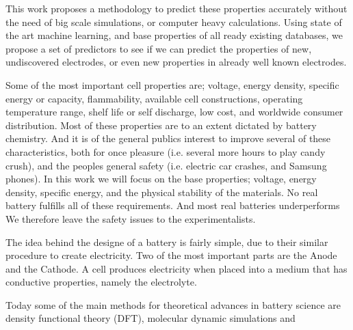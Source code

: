 This work proposes a methodology to predict these properties accurately without the need of big scale simulations, or computer heavy calculations. Using state of the art machine learning, and base properties of all ready existing databases, we propose a set of predictors to see if we can predict the properties of new, undiscovered electrodes, or even new properties in already well known electrodes.

Some of the most important cell properties are; voltage, energy density, specific energy or capacity, flammability, available cell constructions, operating temperature range, shelf life or self discharge, low cost, and worldwide consumer distribution. Most of these properties are to an extent dictated by battery chemistry. And it is of the general publics interest to improve several of these characteristics, both for once pleasure (i.e. several more hours to play candy crush), and the peoples general safety (i.e. electric car crashes, and Samsung phones). In this work we will focus on the  base properties; voltage, energy density, specific energy, and the physical stability of the materials. No real battery fulfills all of these requirements. And most real batteries underperforms  We therefore leave the safety issues to the experimentalists.


The idea behind the designe of a battery is fairly simple, due to their similar procedure to create electricity. Two of the most important parts are the Anode and the Cathode. A cell produces electricity when placed into a medium that has conductive properties, namely the electrolyte.



Today some of the main methods for theoretical advances in battery science are density functional theory (DFT), molecular dynamic simulations and





